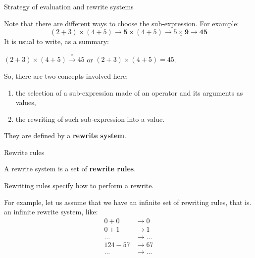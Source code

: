 %
\begin{frame}{Strategy of evaluation and rewrite systems}

  Note that there are different ways to choose the sub-expression. For
  example:
  \begin{equation*}
    (\underline{2+3}) \times (4+5) \rightarrow \textbf{5} \times
    (\underline{4+5}) \rightarrow \underline{5 \times \textbf{9}}
    \rightarrow \textbf{45}
  \end{equation*}
  It is usual to write, as a summary:
  \begin{center}
    $(2+3)\times(4+5) \xrightarrow{*} 45$ or $(2+3)\times(4+5)=45$.
  \end{center}

  So, there are two concepts involved here:
  \begin{enumerate}

    \item the selection of a sub-expression made of an operator and
      its arguments as values,

    \item the rewriting of such sub-expression into a value.

  \end{enumerate}
  They are defined by a \textbf{rewrite system}.

\end{frame}

%
\begin{frame}{Rewrite rules}

  A rewrite system is a set of \textbf{rewrite rules}.

  \bigskip

  Rewriting rules specify how to perform a rewrite.

  \bigskip

  For example, let us assume that we have an infinite set of rewriting
  rules, that is. an infinite rewrite system, like:
  \begin{align*}
    0 + 0 & \rightarrow 0\\
    0 + 1 & \rightarrow 1\\
    \dots & \rightarrow \dots\\
    124 - 57 & \rightarrow 67\\
    \dots & \rightarrow \dots
  \end{align*}

\end{frame}

